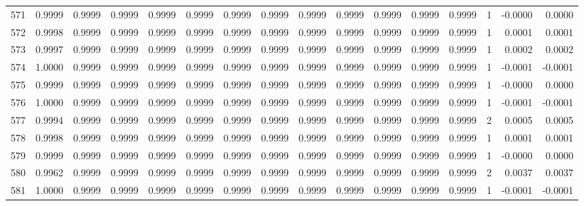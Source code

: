 \begin{tabular}{lrrrrrrrrrrrrrrr}
571 &      0.9999 &  0.9999 &  0.9999 &  0.9999 &  0.9999 &  0.9999 &  0.9999 &  0.9999 &  0.9999 &  0.9999 &   0.9999 &     0.9999 &      1 &                   -0.0000 &                     0.0000 \\
572 &      0.9998 &  0.9999 &  0.9999 &  0.9999 &  0.9999 &  0.9999 &  0.9999 &  0.9999 &  0.9999 &  0.9999 &   0.9999 &     0.9999 &      1 &                    0.0001 &                     0.0001 \\
573 &      0.9997 &  0.9999 &  0.9999 &  0.9999 &  0.9999 &  0.9999 &  0.9999 &  0.9999 &  0.9999 &  0.9999 &   0.9999 &     0.9999 &      1 &                    0.0002 &                     0.0002 \\
574 &      1.0000 &  0.9999 &  0.9999 &  0.9999 &  0.9999 &  0.9999 &  0.9999 &  0.9999 &  0.9999 &  0.9999 &   0.9999 &     0.9999 &      1 &                   -0.0001 &                    -0.0001 \\
575 &      0.9999 &  0.9999 &  0.9999 &  0.9999 &  0.9999 &  0.9999 &  0.9999 &  0.9999 &  0.9999 &  0.9999 &   0.9999 &     0.9999 &      1 &                   -0.0000 &                     0.0000 \\
576 &      1.0000 &  0.9999 &  0.9999 &  0.9999 &  0.9999 &  0.9999 &  0.9999 &  0.9999 &  0.9999 &  0.9999 &   0.9999 &     0.9999 &      1 &                   -0.0001 &                    -0.0001 \\
577 &      0.9994 &  0.9999 &  0.9999 &  0.9999 &  0.9999 &  0.9999 &  0.9999 &  0.9999 &  0.9999 &  0.9999 &   0.9999 &     0.9999 &      2 &                    0.0005 &                     0.0005 \\
578 &      0.9998 &  0.9999 &  0.9999 &  0.9999 &  0.9999 &  0.9999 &  0.9999 &  0.9999 &  0.9999 &  0.9999 &   0.9999 &     0.9999 &      1 &                    0.0001 &                     0.0001 \\
579 &      0.9999 &  0.9999 &  0.9999 &  0.9999 &  0.9999 &  0.9999 &  0.9999 &  0.9999 &  0.9999 &  0.9999 &   0.9999 &     0.9999 &      1 &                   -0.0000 &                     0.0000 \\
580 &      0.9962 &  0.9999 &  0.9999 &  0.9999 &  0.9999 &  0.9999 &  0.9999 &  0.9999 &  0.9999 &  0.9999 &   0.9999 &     0.9999 &      2 &                    0.0037 &                     0.0037 \\
581 &      1.0000 &  0.9999 &  0.9999 &  0.9999 &  0.9999 &  0.9999 &  0.9999 &  0.9999 &  0.9999 &  0.9999 &   0.9999 &     0.9999 &      1 &                   -0.0001 &                    -0.0001 \\

\end{tabular}
